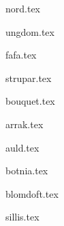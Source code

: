 \documentclass[a6paper,8pt,makeidx]{book}
\begin{document}
\addtocounter{songnum}{1}

{nord.tex}
\clearpage

{ungdom.tex}
\clearpage

{fafa.tex}	
\clearpage

{strupar.tex}	
\clearpage

{bouquet.tex}	
\clearpage

{arrak.tex}	
\clearpage

{auld.tex}	
\clearpage

{botnia.tex}	
\clearpage

{blomdoft.tex}
\clearpage

{sillis.tex}
\clearpage


\renewcommand{\idxtitlefont}{\rmfamily\mdseries}
\renewcommand{\idxlyricfont}{\rmfamily\mdseries}
\renewcommand{\idxheadfont}{\sffamily\it\large}
\setlength{\idxheadwidth}{0.5cm}
\end{document}

